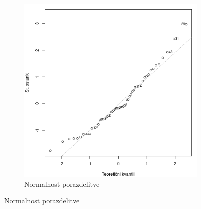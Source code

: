 \begin{figure}[!h]
\begin{subfigure}[ht]{0.49\textwidth}
        \includegraphics[width=\textwidth]{res/normalnost-porazdelitve.png}
        \caption{Normalnost porazdelitve}
        \label{img:normalnost-porazdelitve}
    \end{subfigure}


\end{figure}
